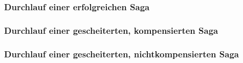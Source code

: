 \subsubsection{Durchlauf einer erfolgreichen Saga}

\subsubsection{Durchlauf einer gescheiterten, kompensierten Saga}

\subsubsection{Durchlauf einer gescheiterten, nichtkompensierten Saga}
